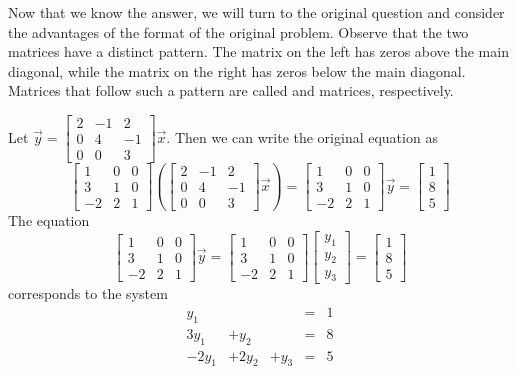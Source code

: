 \documentclass{ximera}
\begin{document}
\begin{exploration}
Now that we know the answer, we will turn to the original question and consider the advantages of the format of the original problem.  Observe that the two matrices have a distinct pattern.  The matrix on the left has zeros above the main diagonal, while the matrix on the right has zeros below the main diagonal.  Matrices that follow such a pattern are called  and  matrices, respectively.
 
Let $\vec{y}=\begin{bmatrix}2&-1&2\\0&4&-1\\0&0&3\end{bmatrix}\vec{x}$.  Then we can write the original equation as
$$\begin{bmatrix}1&0&0\\3&1&0\\-2&2&1\end{bmatrix}\left(\begin{bmatrix}2&-1&2\\0&4&-1\\0&0&3\end{bmatrix}\vec{x}\right)=\begin{bmatrix}1&0&0\\3&1&0\\-2&2&1\end{bmatrix}\vec{y}=\begin{bmatrix}1\\8\\5\end{bmatrix}$$
The equation
$$\begin{bmatrix}1&0&0\\3&1&0\\-2&2&1\end{bmatrix}\vec{y}=\begin{bmatrix}1&0&0\\3&1&0\\-2&2&1\end{bmatrix}\begin{bmatrix}y_1\\y_2\\y_3\end{bmatrix}=\begin{bmatrix}1\\8\\5\end{bmatrix}$$
corresponds to the system
$$\begin{matrix}
     y_1&&&=&1\\
       3y_1 & +y_2&&= &8 \\
      -2y_1&+2y_2&+y_3&=&5
    \end{matrix}$$
     

\end{exploration}
\end{document}
